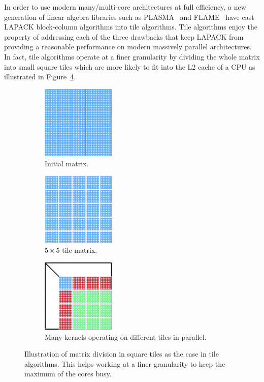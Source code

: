 In order to use modern many/multi-core architectures at full
efficiency, a new generation of linear algebra libraries such as
PLASMA~\cite{DBLP:journals/corr/abs-0709-1272} and FLAME~\cite{FLAWN3}
have cast LAPACK block-column algorithms into tile algorithms. Tile
algorithms enjoy the property of addressing each of the three
drawbacks that keep LAPACK from providing a reasonable performance on
modern massively parallel architectures.
In fact, tile algorithms operate at a
finer granularity by dividing the whole matrix into
small square tiles which are more likely to fit into the L2 cache of a
CPU as illustrated in Figure~\ref{fig:tile_algo}.
\begin{figure}[th]
  \captionsetup[subfigure]{justification=justified,singlelinecheck=false}
  \begin{subfigure}[t]{0.3 \textwidth}
    \includegraphics[width=3.5cm, height=3.5cm]{fig/one-sided-initial}
    \caption{\label{fig:initial_matrix}Initial matrix.}
  \end{subfigure}
  \hfill
  \begin{subfigure}[t]{0.3 \textwidth}
    \includegraphics[width=3.5cm, height=3.5cm]{fig/one-sided-tile}
    \caption{\label{fig:tile_matrix}
      $5\times 5$ tile matrix.}
  \end{subfigure}
  \hfill
    \begin{subfigure}[t]{0.3 \textwidth}
    \includegraphics[width=3.5cm, height=3.5cm]{fig/one-sided-tile-facto}
    \caption{\label{fig:tile_facto}
     Many kernels operating on different tiles in parallel.}
  \end{subfigure}
  \caption{Illustration of matrix division in square tiles as the case
    in tile algorithms. This helps working at  a finer granularity to
    keep the maximum of the cores busy.}
    \label{fig:tile_algo}
\end{figure}

